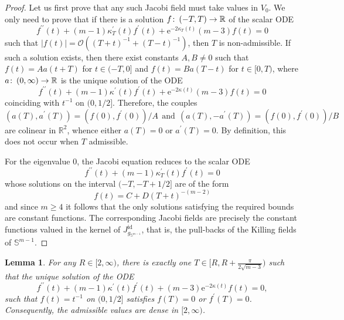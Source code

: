 \documentclass{article}
\numberwithin{equation}{section}        %
\theoremstyle{bfnote}
\newtheorem{lem}[thm]{Lemma}                %
\theoremstyle{definition}
\theoremstyle{bfremark}
\newcommand{\col}{\colon \thinspace}        %
\newcommand{\R}{\mathbb{R}}                 %
\newcommand{\Sp}{\mathbb{S}}                %
\DeclareMathOperator{\id}{id}                   %
\begin{document}
\begin{proof}
    Let us first prove that any such Jacobi field must take values in $V_0$. We only need to prove that if there is a solution $f \col (-T,T) \rightarrow \R$ of the scalar ODE
    \begin{equation*}
        f^{\prime\prime}(t) + (m-1) \kappa^\prime_T(t) f^\prime(t) + \mathrm{e}^{-2\kappa_T(t)} (m-3) f(t) = 0
    \end{equation*}
    such that $|f(t)| = \mathcal{O}((T+t)^{-1} + (T-t)^{-1})$, then $T$ is non-admissible. If such a solution exists, then there exist constants $A, B \neq 0$ such that $f(t) = A a(t+T)$ for $t \in (-T,0]$ and $f(t) = B a(T-t)$ for $t \in [0,T)$, where $a \col (0,\infty) \rightarrow \R$ is the unique solution of the ODE
    \begin{equation*}
        f^{\prime\prime}(t) + (m-1) \kappa^\prime(t) f^\prime(t) + \mathrm{e}^{-2\kappa(t)}(m-3) f(t) = 0
    \end{equation*}
    coinciding with $t^{-1}$ on $(0,1/2]$. Therefore, the couples
    \begin{equation*}
        (a(T),a^\prime(T)) = (f(0), f^\prime(0))/A ~~ \text{and} ~~ (a(T),-a^\prime(T)) = (f(0),f^\prime(0))/B
    \end{equation*}
    are colinear in $\R^2$, whence either $a(T) = 0$ or $a^\prime(T) = 0$. By definition, this does not occur when $T$ admissible.

    For the eigenvalue $0$, the Jacobi equation reduces to the scalar ODE
    \begin{equation*}
        f^{\prime\prime}(t) + (m-1) \kappa^\prime_T(t) f^\prime(t) = 0 
    \end{equation*}
    whose solutions on the interval $(-T,-T+1/2]$ are of the form
    \begin{equation*}
        f(t) = C + D (T+t)^{-(m-2)}
    \end{equation*}
    and since $m \geq 4$ it follows that the only solutions satisfying the required bounds are constant functions. The corresponding Jacobi fields are precisely the constant functions valued in the kernel of $J^{\id}_{g_{\Sp^{m-1}}}$, that is, the pull-backs of the Killing fields of $\Sp^{m-1}$.
\end{proof}

\begin{lem}     \label{lem: Point (i) of admissible values}
    For any $R \in [2,\infty)$, there is exactly one $T \in [R,R+\tfrac{\pi}{2\sqrt{m-3}})$ such that the unique solution of the ODE
    \begin{equation*}
            f^{\prime\prime}(t) + (m-1) \kappa^\prime(t) f^\prime(t) + (m-3) \mathrm{e}^{-2\kappa(t)} f(t) = 0 ,
    \end{equation*}
    such that $f(t) = t^{-1}$ on $(0,1/2]$ satisfies $f(T) = 0$ or $f^\prime(T) = 0$. Consequently, the admissible values are dense in $[2,\infty)$.
\end{lem}
\end{document}
